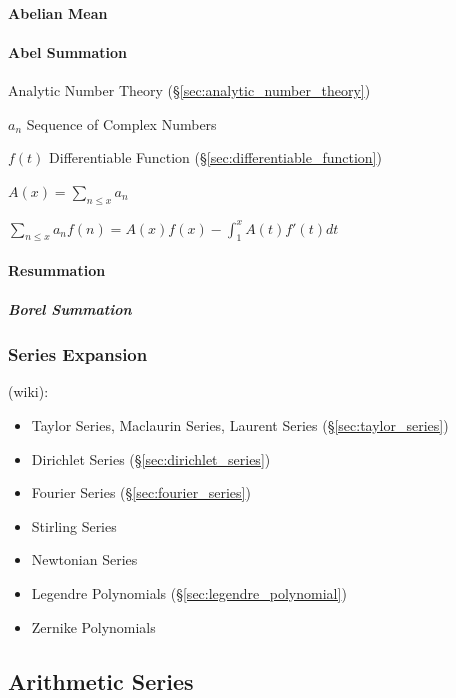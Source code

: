 \paragraph{Abelian Mean}\label{sec:abelian_mean}\hfill

\paragraph{Abel Summation}\label{sec:abel_summation}\hfill

Analytic Number Theory (\S\ref{sec:analytic_number_theory})

$a_n$ Sequence of Complex Numbers

$f(t)$ Differentiable Function (\S\ref{sec:differentiable_function})

$A(x) = \sum_{n \leq x} a_n$

$\sum_{n \leq x} a_n f(n) = A(x)f(x) - \int_1^x A(t)f'(t) dt$



\paragraph{Resummation}\label{sec:resummation}\hfill

\subparagraph{Borel Summation}\label{sec:borel_summation}\hfill



\subsubsection{Series Expansion}\label{sec:series_expansion}

(wiki):
\begin{itemize}
  \item Taylor Series, Maclaurin Series, Laurent Series
    (\S\ref{sec:taylor_series})
  \item Dirichlet Series (\S\ref{sec:dirichlet_series})
  \item Fourier Series (\S\ref{sec:fourier_series})
  \item Stirling Series
  \item Newtonian Series
  \item Legendre Polynomials (\S\ref{sec:legendre_polynomial})
  \item Zernike Polynomials
\end{itemize}



\subsection{Arithmetic Series}\label{sec:arithmetic_series}

